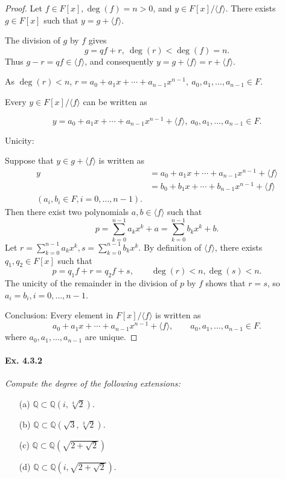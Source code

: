 \documentclass[11pt,a4paper]{article}
\newcommand{\Q}{\mathbb{Q}}
\begin{document}
\begin{proof}
Let $f \in F[x],\deg(f) = n>0$, and $y \in F[x]/\langle f \rangle$. There exists $g \in F[x]$ such that $y = g +\langle f \rangle$.

The division of $g$ by $f$ gives 
$$g = qf+r,\  \deg(r)  < \deg(f)=n.$$
Thus $g-r =qf \in \langle f \rangle$, and consequently $y=g+\langle f \rangle = r+ \langle f \rangle$.

As $\deg(r)<n$, $r = a_0+a_1x+\cdots+a_{n-1}x^{n-1},\ a_0,a_1,\ldots,a_{n-1} \in F$.

Every $y \in F[x]/\langle f \rangle$ can be written as

$$y = a_0+a_1x+\cdots+a_{n-1}x^{n-1} + \langle f \rangle, \ a_0,a_1,\ldots,a_{n-1} \in F.$$

{\bigskip}

Unicity: 

Suppose that $y \in g+\langle f \rangle$ is written as
\begin{align*}
y &= a_0+a_1x+\cdots+a_{n-1}x^{n-1} + \langle f \rangle\\
&=b_0+b_1x+\cdots+b_{n-1}x^{n-1} + \langle f \rangle\\
(a_i, b_i \in F, i = 0,\ldots,n-1).
\end{align*}
Then there exist two polynomials $a,b \in \langle f \rangle$ such that $$p = \sum\limits_{k=0}^{n-1}{a_kx^k} + a = \sum\limits_{k=0}^{n-1}{b_kx^k} + b.$$
Let $r = \sum\limits_{k=0}^{n-1}{a_kx^k}, s = \sum\limits_{k=0}^{n-1}{b_kx^k}$.
By definition of $\langle f \rangle$,  there exists $q_1,q_2\in F[x]$ such that $$p = q_1f + r=q_2f+s, \qquad \deg(r)<n, \deg(s)<n.$$ 
The unicity of the remainder in the division of $p$ by $f$ shows that  $r=s$, so $a_i=b_i, i=0,\ldots,n-1$.

{\bigskip}

Conclusion: Every element in  $F[x]/\langle f \rangle$ is written as
$$a_0+a_1x+\cdots+a_{n-1}x^{n-1} + \langle f \rangle, \qquad a_0,a_1,\ldots,a_{n-1} \in F.$$
where $a_0,a_1,\ldots, a_{n-1}$ are unique.
\end{proof}

\paragraph{Ex. 4.3.2}

{\it Compute the degree of the following extensions:
\begin{enumerate}
\item[(a)] $\Q \subset \Q(i,\sqrt[4]{2})$.
\item[(b)] $\Q \subset \Q(\sqrt{3},\sqrt[3]{2})$.
\item[(c)] $\Q \subset \Q(\sqrt{2 + \sqrt{2}})$
\item[(d)] $\Q \subset \Q(i,\sqrt{2 + \sqrt{2}})$.
\end{enumerate}
}
\end{document}

